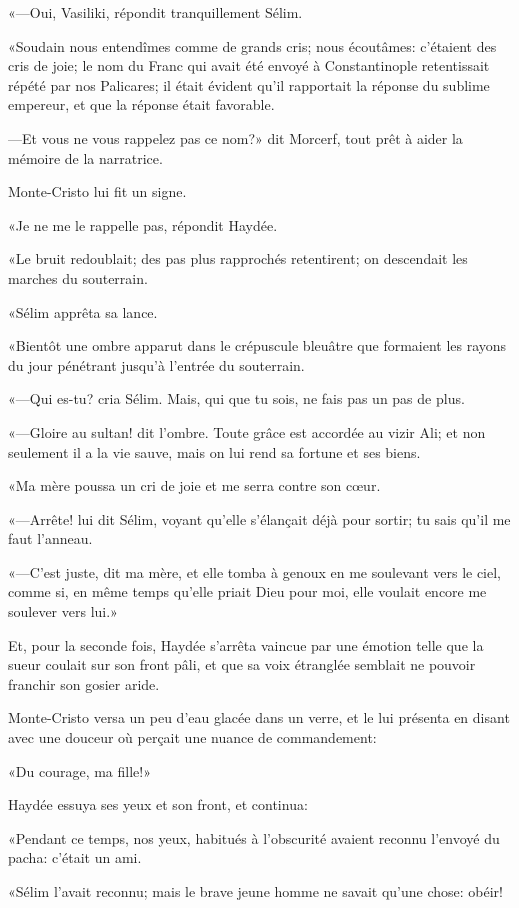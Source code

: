 «—Oui, Vasiliki, répondit tranquillement Sélim. 

«Soudain nous entendîmes comme de grands cris; nous écoutâmes: c'étaient des cris de joie; le nom du Franc qui avait été envoyé à Constantinople retentissait répété par nos Palicares; il était évident qu'il rapportait la réponse du sublime empereur, et que la réponse était favorable. 

—Et vous ne vous rappelez pas ce nom?» dit Morcerf, tout prêt à aider la mémoire de la narratrice. 

Monte-Cristo lui fit un signe. 

«Je ne me le rappelle pas, répondit Haydée. 

«Le bruit redoublait; des pas plus rapprochés retentirent; on descendait les marches du souterrain. 

«Sélim apprêta sa lance. 

«Bientôt une ombre apparut dans le crépuscule bleuâtre que formaient les rayons du jour pénétrant jusqu'à l'entrée du souterrain. 

«—Qui es-tu? cria Sélim. Mais, qui que tu sois, ne fais pas un pas de plus. 

«—Gloire au sultan! dit l'ombre. Toute grâce est accordée au vizir Ali; et non seulement il a la vie sauve, mais on lui rend sa fortune et ses biens. 

«Ma mère poussa un cri de joie et me serra contre son cœur. 

«—Arrête! lui dit Sélim, voyant qu'elle s'élançait déjà pour sortir; tu sais qu'il me faut l'anneau. 

«—C'est juste, dit ma mère, et elle tomba à genoux en me soulevant vers le ciel, comme si, en même temps qu'elle priait Dieu pour moi, elle voulait encore me soulever vers lui.» 

Et, pour la seconde fois, Haydée s'arrêta vaincue par une émotion telle que la sueur coulait sur son front pâli, et que sa voix étranglée semblait ne pouvoir franchir son gosier aride. 

Monte-Cristo versa un peu d'eau glacée dans un verre, et le lui présenta en disant avec une douceur où perçait une nuance de commandement: 

«Du courage, ma fille!» 

Haydée essuya ses yeux et son front, et continua: 

«Pendant ce temps, nos yeux, habitués à l'obscurité avaient reconnu l'envoyé du pacha: c'était un ami. 

«Sélim l'avait reconnu; mais le brave jeune homme ne savait qu'une chose: obéir! 

